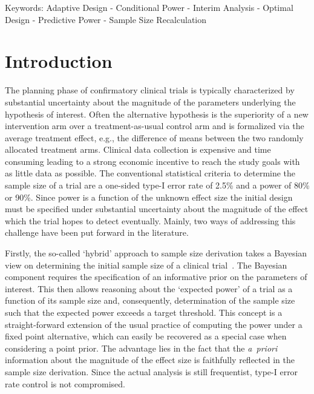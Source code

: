 \documentclass{article}
\begin{document}
Keywords: Adaptive Design - Conditional Power - Interim Analysis - Optimal Design - Predictive Power - Sample Size Recalculation

\newpage

\section{Introduction}
\label{sec:introduction}

The planning phase of confirmatory clinical trials is typically 
characterized by substantial uncertainty about the magnitude of the 
parameters underlying the hypothesis of interest.
Often the alternative hypothesis is the superiority of a new intervention arm
over a treatment-as-usual control arm and is formalized via
the average treatment effect, e.g., the difference of means between the 
two randomly allocated treatment arms. 
Clinical data collection is expensive and time consuming leading to a
strong economic incentive to reach the study goals with as little data as possible.
The conventional statistical criteria to determine the sample size of a trial 
are a one-sided type-I error rate of
2.5\% and a power of 80\% or 90\%.
Since power is a function of the unknown effect size the initial design 
must be specified under substantial uncertainty about the magnitude of the effect which the trial hopes to detect eventually.
Mainly, two ways of addressing this challenge have been put forward in the literature.

Firstly, the so-called `hybrid' approach to sample size 
derivation takes a Bayesian
view on determining the initial sample size of a clinical trial~\citep{spiegelhalter1994}.
The Bayesian component requires the specification of an informative 
prior on the parameters of interest.
This then allows reasoning about the `expected power' of a trial as a
function of its sample size and, consequently, determination of the sample size
such that the expected power exceeds a target threshold. 
This concept is a straight-forward extension of the usual practice of 
computing the power under a fixed point alternative, which can easily be recovered as a special case when considering a point prior.
The advantage lies in the fact that the \textit{a~priori} information about the magnitude of the effect size is faithfully 
reflected in the sample size derivation.
Since the actual analysis is still frequentist, type-I error rate control is not compromised.
\end{document}
